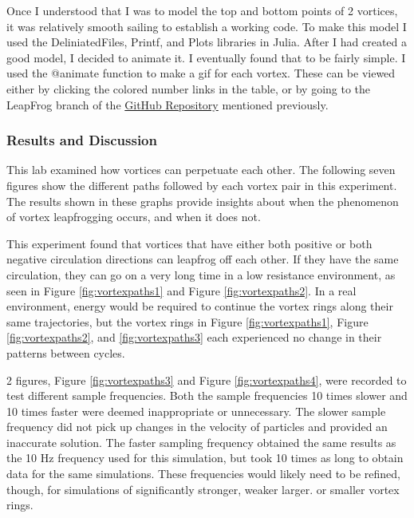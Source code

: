 \documentclass{article}
\begin{document}
Once I understood that I was to model the top and bottom points of 2 vortices, it was relatively smooth sailing to establish a working code. To make this model I used the DeliniatedFiles, Printf, and Plots libraries in Julia. After I had created a good model, I decided to animate it. I eventually found that to be fairly simple. I used the \textcolor{Dandelion}{@animate} function to make a gif for each vortex. These can be viewed either by clicking the colored number links in the table, or by going to the LeapFrog branch of the \href{https://github.com/JoeSpencer1/497R-Projects.git}{GitHub Repository} mentioned previously. \newline

\subsubsection*{Results and Discussion}

This lab examined how vortices can perpetuate each other. The following seven figures show the different paths followed by each vortex pair in this experiment. The results shown in these graphs provide insights about when the phenomenon of vortex leapfrogging occurs, and when it does not.\newline

This experiment found that vortices that have either both positive or both negative circulation directions can leapfrog off each other. If they have the same circulation, they can go on a very long time in a low resistance environment, as seen in Figure \ref{fig:vortexpaths1} and Figure \ref{fig:vortexpaths2}. In a real environment, energy would be required to continue the vortex rings along their same trajectories, but the vortex rings in Figure \ref{fig:vortexpaths1}, Figure \ref{fig:vortexpaths2}, and \ref{fig:vortexpaths3} each experienced no change in their patterns between cycles.

2 figures, Figure \ref{fig:vortexpaths3} and Figure \ref{fig:vortexpaths4}, were recorded to test different sample frequencies. Both the sample frequencies 10 times slower and 10 times faster were deemed inappropriate or unnecessary. The slower sample frequency did not pick up changes in the velocity of particles and provided an inaccurate solution. The faster sampling frequency obtained the same results as the 10 Hz frequency used for this simulation, but took 10 times as long to obtain data for the same simulations. These frequencies would likely need to be refined, though, for simulations of significantly stronger, weaker larger. or smaller vortex rings.
\end{document}
